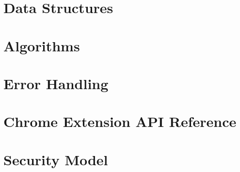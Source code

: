 \section{Data Structures}

\section{Algorithms}

\section{Error Handling}

\section{Chrome Extension API Reference}

\section{Security Model}